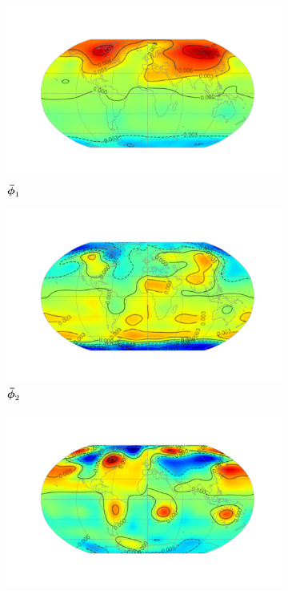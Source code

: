 \begin{figure}
	\centering
	\begin{subfigure}[b]{0.45\textwidth}
		\includegraphics[width=\textwidth]{ftsm_res_TREFHT_fpc_0}
		\caption{$\bm{{\bar{\phi}}}_{1}$}
		\label{fig:ftsm_res_TREFHT_fpc_1}
	\end{subfigure}
	\vfill       
	\begin{subfigure}[b]{0.45\textwidth}
		\includegraphics[width=\textwidth]{ftsm_res_TREFHT_fpc_1}
		\caption{$\bm{{\bar{\phi}}}_{2}$}
		\label{fig:ftsm_res_TREFHT_fpc_2}
	\end{subfigure}
	\begin{subfigure}[b]{0.45\textwidth}
		\includegraphics[width=\textwidth]{ftsm_res_TREFHT_fpc_2}

\end{subfigure}
\end{figure}
